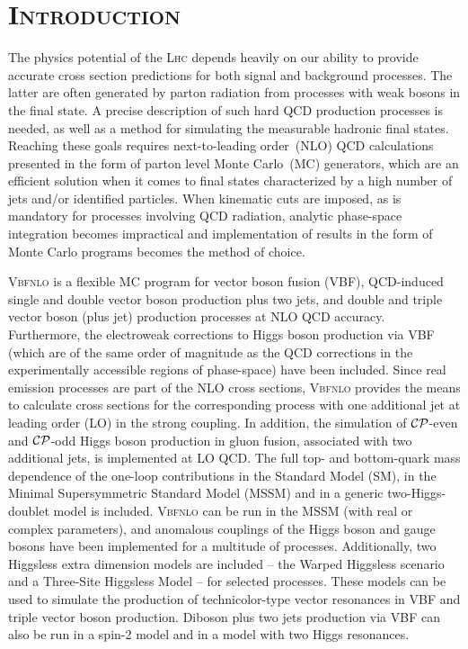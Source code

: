\documentclass[english,12pt]{article}
\begin{document}
\newpage

\tableofcontents

\newpage

\section{\textsc{Introduction}}

The physics potential of the \textsc{Lhc} depends heavily on our ability to
provide accurate cross section predictions for both signal and background
processes. The latter are often generated by parton radiation from processes
with weak bosons in the final state. A precise description of such hard QCD
production processes is needed, as well as a method for simulating the
measurable hadronic final states. Reaching these goals requires next-to-leading
order~(NLO) QCD calculations presented in the form of parton level Monte
Carlo~(MC) generators, which are an efficient solution when it comes to final
states characterized by a high number of jets and/or identified particles. When
kinematic cuts are imposed, as is mandatory for processes involving QCD
radiation, analytic phase-space integration becomes impractical and
implementation of results in the form of Monte Carlo programs becomes the method
of choice. 

\textsc{Vbfnlo} is a flexible MC program for vector boson fusion (VBF),
QCD-induced single and double vector boson production plus two jets, and double
and triple vector boson (plus jet) production processes at NLO QCD accuracy. Furthermore,
the electroweak corrections to Higgs boson production via VBF (which are of the
same order of magnitude as the QCD corrections in the experimentally accessible
regions of phase-space) have been included.  Since real emission processes are part
of the NLO cross sections, \textsc{Vbfnlo} provides the means to calculate
cross sections for the corresponding process with  one additional jet at leading
order (LO) in the strong coupling. In addition, the simulation of
$\cal{CP}$-even and $\cal{CP}$-odd Higgs boson production in gluon fusion,
associated with two additional jets, is implemented at LO QCD.  The full top-
and bottom-quark mass dependence of the one-loop contributions in the Standard
Model (SM), in the Minimal Supersymmetric Standard Model (MSSM) and in a
generic two-Higgs-doublet model is included.
\textsc{Vbfnlo} can be run in the MSSM (with real or complex parameters), and
anomalous couplings of the Higgs boson and gauge bosons have been implemented
for a multitude of processes. Additionally, two Higgsless extra dimension models are
included -- the Warped Higgsless scenario and a Three-Site Higgsless Model --
for selected processes.  These models can be used to simulate the production of
technicolor-type vector resonances in VBF and triple vector boson production. 
Diboson plus two jets production via VBF can also be run in a spin-2
model and in a model with two Higgs resonances.
\end{document}
